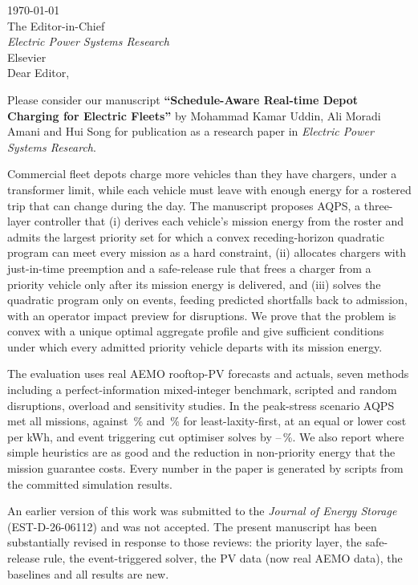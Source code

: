 \documentclass[11pt]{article}
\begin{document}
\noindent \today \\[1em]
The Editor-in-Chief \\
\textit{Electric Power Systems Research} \\
Elsevier \\[1em]
Dear Editor,

\medskip
Please consider our manuscript \textbf{``Schedule-Aware Real-time Depot Charging for Electric Fleets''} by
Mohammad Kamar Uddin, Ali Moradi Amani and Hui Song for publication as a research paper in
\textit{Electric Power Systems Research}.

Commercial fleet depots charge more vehicles than they have chargers, under a transformer limit, while each
vehicle must leave with enough energy for a rostered trip that can change during the day. The manuscript
proposes AQPS, a three-layer controller that (i) derives each vehicle's mission energy from the roster and
admits the largest priority set for which a convex receding-horizon quadratic program can meet every
mission as a hard constraint, (ii) allocates chargers with just-in-time preemption and a safe-release rule
that frees a charger from a priority vehicle only after its mission energy is delivered, and (iii) solves
the quadratic program only on events, feeding predicted shortfalls back to admission, with an operator
impact preview for disruptions. We prove that the problem is convex with a unique optimal aggregate profile
and give sufficient conditions under which every admitted priority vehicle departs with its mission energy.

The evaluation uses real AEMO rooftop-PV forecasts and actuals, seven methods including a
perfect-information mixed-integer benchmark, scripted and random disruptions, overload and sensitivity
studies. In the peak-stress scenario AQPS met all missions, against \RMissionLLFSThreeFortyFive\,\% and
\RMissionLLFSThreeNinety\,\% for least-laxity-first, at an equal or lower cost per kWh, and event triggering
cut optimiser solves by \RTotRedMin--\RTotRedMax\,\%. We also report where simple heuristics are as good and
the reduction in non-priority energy that the mission guarantee costs. Every number in the paper is
generated by scripts from the committed simulation results.

An earlier version of this work was submitted to the \textit{Journal of Energy Storage} (EST-D-26-06112) and
was not accepted. The present manuscript has been substantially revised in response to those reviews: the
priority layer, the safe-release rule, the event-triggered solver, the PV data (now real AEMO data), the
baselines and all results are new.
\end{document}
